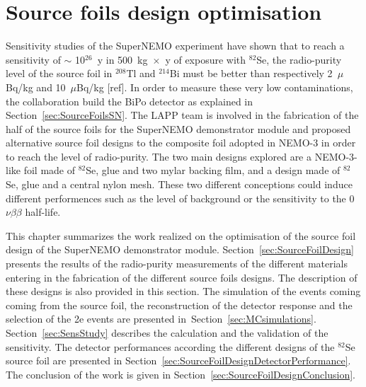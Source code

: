 \documentclass[main.tex]{subfiles}
\begin{document}
\chapter{Source foils design optimisation}




\NI Sensitivity studies of the SuperNEMO experiment have shown that to reach a sensitivity of $\sim$ 10$^{\text{26}}$~y in 500~kg~$\times$~y of exposure with $^{\text{82}}$Se, the radio-purity level of the source foil in $^{\text{208}}$Tl and $^{\text{214}}$Bi must be better than respectively 2~$\mu$Bq/kg and 10~$\mu$Bq/kg [ref]. In order to measure these very low contaminations, the collaboration build the BiPo detector as explained in Section~\ref{sec:SourceFoilsSN}. The LAPP team is involved in the fabrication of the half of the source foils for the SuperNEMO demonstrator module and proposed alternative source foil designs to the composite foil adopted in NEMO-3 in order to reach the level of radio-purity. The two main designs explored are a NEMO-3-like foil made of $^{\text{82}}$Se, glue and two mylar backing film, and a design made of $^{\text{82}}$Se, glue and a central nylon mesh. These two different conceptions could induce different performences such as the level of background or the sensitivity to the 0$\nu\beta\beta$ half-life. 



\bigskip


\NI This chapter summarizes the work realized on the optimisation of the source foil design of the SuperNEMO demonstrator module. Section~\ref{sec:SourceFoilDesign} presents the results of the radio-purity measurements of the different materials entering in the fabrication of the different source foils designs. The description of these designs is also provided in this section. The simulation of the events coming coming from the source foil, the reconstruction of the detector response and the selection of the 2e events are presented in~Section~\ref{sec:MCsimulations}. Section~\ref{sec:SensStudy} describes the calculation and the validation of the sensitivity. The detector performances according the different designs of the $^{\text{82}}$Se source foil are presented in Section~\ref{sec:SourceFoilDesignDetectorPerformance}. The conclusion of the work is given in Section~\ref{sec:SourceFoilDesignConclusion}.
\end{document}
